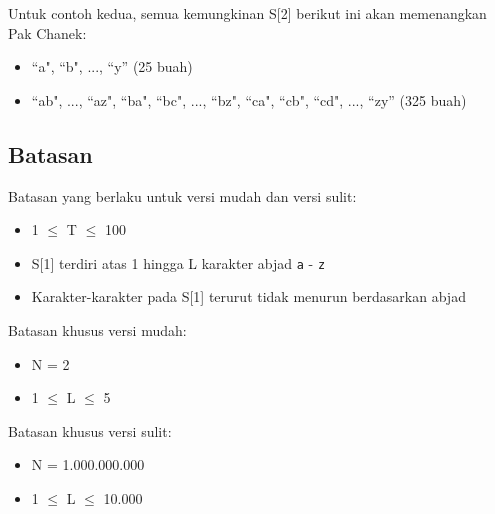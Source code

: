 \documentclass[../main_problemset.tex]{subfiles} %
\begin{document}
Untuk contoh kedua, semua kemungkinan S[2] berikut ini akan memenangkan Pak Chanek:

\begin{itemize}
	\item ``a", ``b", ..., ``y'' (25 buah)
	\item ``ab", ..., ``az", ``ba", ``bc", ..., ``bz", ``ca", ``cb", ``cd", ..., ``zy'' (325 buah)
\end{itemize}

\subsection*{Batasan}

\begin{minipage}[t]{0.47\textwidth}
	
Batasan yang berlaku untuk versi mudah dan versi sulit:

\begin{itemize}
	\item 1 $ \leq $ T $ \leq $ 100
	\item S[1] terdiri atas 1 hingga L karakter abjad \texttt{a} - \texttt{z}
	\item Karakter-karakter pada S[1] terurut tidak menurun berdasarkan abjad
\end{itemize}
\end{minipage}
\begin{minipage}[t]{0.06\textwidth}
	\hfill
\end{minipage}
\begin{minipage}[t]{0.47\textwidth}
Batasan khusus versi mudah:
\begin{itemize}
	\item N = 2
	\item 1 $ \le $ L $ \le $ 5
\end{itemize}

\vspace{.2cm}

Batasan khusus versi sulit:
\begin{itemize}
	\item N = 1.000.000.000
	\item 1 $ \le $ L $ \le $ 10.000
\end{itemize}
\end{minipage}
\end{document}
